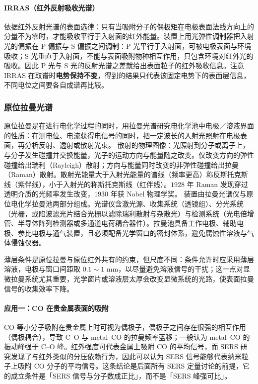 \paragraph{IRRAS（红外反射吸收光谱）}
依据红外反射光谱的表面选律：只有当吸附分子的偶极矩在电极表面法线方向上的分量不为零时，才能吸收平行于入射面的红外能量。装置上用光弹性调制器把入射光的偏振在 P 偏振与 S 偏振之间调制：P 光平行于入射面，可被电极表面与环境吸收；S 光垂直于入射面，不能与表面吸附物种相互作用，只包含环境对红外光的吸收。因此 P 光与 S 光的反射光谱之差就给出表面粒子的红外吸收信息。注意 IRRAS 在取谱时\textbf{电势保持不变}，得到的结果只代表该固定电势下的表面层信息，不同电位之间要各自成谱再比较。

\subsubsection{原位拉曼光谱}

\begin{principle}
 原位拉曼是在进行电化学过程的同时，用拉曼光谱研究电化学池中电极／溶液界面的性质：在测电位、电流获得电信号的同时，把一定波长的入射光照射在电极表面，再分析反射、透射或散射光束。
 散射的物理图像：光照射到分子或离子上，与分子发生碰撞并交换能量，光子的运动方向与能量随之改变。仅改变方向的弹性碰撞给出瑞利（Rayleigh）散射；方向与能量同时改变的非弹性碰撞给出拉曼（Raman）散射。散射光能量大于入射光能量的谱线（频率更高）称反斯托克斯线（紫伴线），小于入射光的称斯托克斯线（红伴线）。$1928$ 年 Raman 发现穿过透明介质的光频率发生改变，$1930$ 年获 Nobel 物理学奖。
 装置由拉曼光谱仪与原位电化学拉曼池两部分组成。光谱仪含激光源、收集系统（透镜组）、分光系统（光栅，或陷波滤光片结合光栅以滤除瑞利散射与杂散光）与检测系统（光电倍增管、半导体阵列检测器或多通道电荷耦合器件）。拉曼池具备工作电极、辅助电极、参比电极与通气装置，且必须配备光学窗口的密封体系，避免腐蚀性溶液与气体侵蚀仪器。
\end{principle}

\begin{measure}
 薄层条件是原位拉曼与原位红外共有的约束，但尺度不同：条件允许时应采用薄层溶液，电极与窗口间距取 $0.1\sim1$ mm，以尽量避免溶液信号的干扰；这一点对显微拉曼系统尤其重要，光学窗片或溶液层太厚会改变显微系统的光路，使表面拉曼信号的收集效率下降。
\end{measure}

\paragraph{应用一：CO 在贵金属表面的吸附}
CO 等小分子吸附在贵金属上时可视为偶极子，偶极子之间存在很强的相互作用（偶极耦合），导致 C--O 与 metal--CO 的拉曼频率蓝移；一般认为 metal--CO 的振动峰强于 C--O 峰。红外强度可代表金属上吸附 CO 的平均信号，而 SERS 研究发现了与红外类似的分压依赖行为，因此可以认为 SERS 信号能够代表纳米粒子上吸附 CO 分子的平均信号。这条结论是后面所有 SERS 定量讨论的前提，它的成立条件是「SERS 信号与分子数成正比」，而不是「SERS 峰强可比」。

